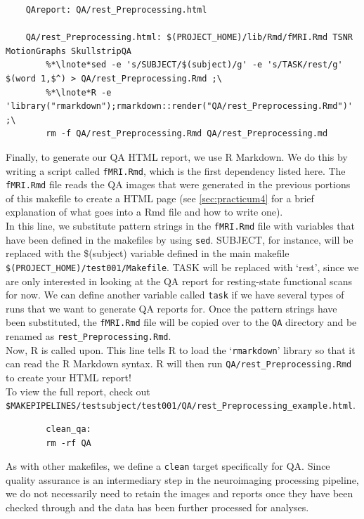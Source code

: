 \begin{lstlisting}
	QAreport: QA/rest_Preprocessing.html 

	QA/rest_Preprocessing.html: $(PROJECT_HOME)/lib/Rmd/fMRI.Rmd TSNR MotionGraphs SkullstripQA
		%*\lnote*sed -e 's/SUBJECT/$(subject)/g' -e 's/TASK/rest/g' $(word 1,$^) > QA/rest_Preprocessing.Rmd ;\
		%*\lnote*R -e 'library("rmarkdown");rmarkdown::render("QA/rest_Preprocessing.Rmd")' ;\
		rm -f QA/rest_Preprocessing.Rmd QA/rest_Preprocessing.md
\end{lstlisting}


Finally, to generate our QA HTML report, we use R Markdown. We do this by writing a script called \texttt{fMRI.Rmd}, which is the first dependency listed here. The \texttt{fMRI.Rmd} file reads the QA images that were generated in the previous portions of this makefile to create a HTML page (see \autoref{sec:practicum4} for a brief explanation of what goes into a Rmd file and how to write one). \\
 In this line, we substitute pattern strings in the \texttt{fMRI.Rmd} file with variables that have been defined in the makefiles by using \texttt{sed}. SUBJECT, for instance, will be replaced with the \$(subject) variable defined in the main makefile \texttt{\$(PROJECT\_HOME)/test001/Makefile}. TASK will be replaced with `rest', since we are only interested in looking at the QA report for resting-state functional scans for now. We can define another variable called \texttt{task} if we have several types of runs that we want to generate QA reports for. Once the pattern strings have been substituted, the \texttt{fMRI.Rmd} file will be copied over to the \texttt{QA} directory and be renamed as \texttt{rest\_Preprocessing.Rmd}. \\
 Now, R is called upon. This line tells R to load the `\texttt{rmarkdown}' library so that it can read the R Markdown syntax. R will then run \texttt{QA/rest\_Preprocessing.Rmd} to create your HTML report! \\

To view the full report, check out \texttt{\$MAKEPIPELINES/testsubject/test001/QA/rest_Preprocessing_example.html}. 

\begin{lstlisting}
		clean_qa: 
		rm -rf QA
\end{lstlisting}


As with other makefiles, we define a \texttt{clean} target specifically for QA. Since quality assurance is an intermediary step in the neuroimaging processing pipeline, we do not necessarily need to retain the images and reports once they have been checked through and the data has been further processed for analyses. 


